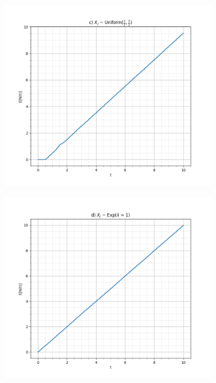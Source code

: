 \documentclass[a4paper]{article}
\begin{document}
\begin{itemize}
\begin{figure} [t]
\begin{subfigure}[b]{0.45\textwidth}
                \includegraphics[width=1\linewidth]{src/c.png}
            \end{subfigure}
            \begin{subfigure}[b]{0.45\textwidth}
                \includegraphics[width=1\linewidth]{src/d.png}
            \end{subfigure}
            \\
            \begin{subfigure}[b]{0.45\textwidth}

\end{subfigure}
\end{figure}
\end{itemize}
\end{document}
